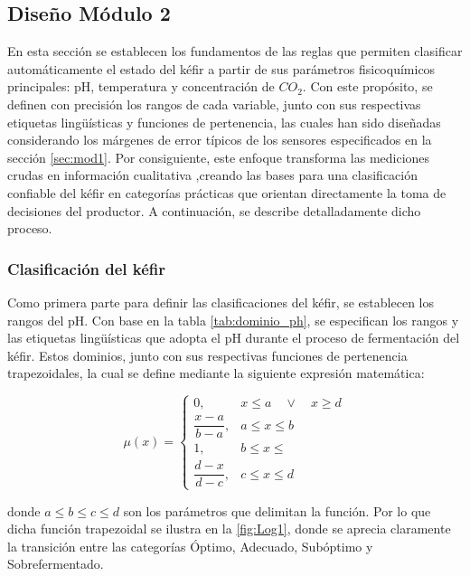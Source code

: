 \subsection{Diseño Módulo 2}

En esta sección se establecen los fundamentos de las reglas que permiten 
clasificar automáticamente el estado del kéfir a partir de sus parámetros 
fisicoquímicos principales: pH, temperatura y concentración de $CO_{2}$. 
Con este propósito, se definen con precisión los rangos de cada variable, 
junto con sus respectivas etiquetas lingüísticas y funciones de pertenencia, 
las cuales han sido diseñadas considerando los márgenes de error típicos de los sensores 
especificados en la sección \ref{sec:mod1}.
Por consiguiente, este enfoque transforma las mediciones crudas en información cualitativa 
,creando las bases para una clasificación confiable del kéfir en 
categorías prácticas que orientan directamente la toma de decisiones del productor. 
A continuación, se describe detalladamente dicho proceso.

\subsubsection{Clasificación del kéfir}
Como primera parte para definir las clasificaciones del kéfir, 
se establecen los rangos del pH. Con base en la tabla \cref{tab:dominio_ph},
se especifican los rangos y las etiquetas lingüísticas que adopta el pH durante 
el proceso de fermentación del kéfir. Estos dominios, junto con sus respectivas 
funciones de pertenencia trapezoidales, la cual se define mediante la siguiente expresión matemática:

\begin{equation}
\mu(x) = 
\begin{cases}
0, & x \leq a \quad \vee \quad x \geq d \\[8pt]
\dfrac{x - a}{b - a}, & a \leq x \leq b \\[12pt]
1, & b \leq x \leq \\[12pt]
\dfrac{d - x}{d - c}, & c \leq x \leq d
\end{cases}
\label{eq:trapezoidal}
\end{equation}

donde \(a \leq b \leq c \leq d\) son los parámetros que delimitan la función.
Por lo que dicha función trapezoidal se ilustra en la \cref{fig:Log1}, 
donde se aprecia claramente la transición entre las categorías Óptimo, 
Adecuado, Subóptimo y Sobrefermentado.


